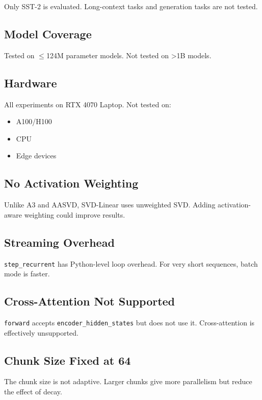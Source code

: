 Only SST-2 is evaluated. Long-context tasks and generation tasks are not 
tested.

\subsection{Model Coverage}

Tested on $\le$124M parameter models. Not tested on \textgreater{}1B models.

\subsection{Hardware}

All experiments on RTX 4070 Laptop. Not tested on:
\begin{itemize}
\item A100/H100
\item CPU
\item Edge devices

\end{itemize}
\subsection{No Activation Weighting}

Unlike A3 and AASVD, SVD-Linear uses unweighted SVD. Adding activation-aware 
weighting could improve results.

\subsection{Streaming Overhead}

\texttt{step\_recurrent} has Python-level loop overhead. For very short sequences, 
batch mode is faster.

\subsection{Cross-Attention Not Supported}

\texttt{forward} accepts \texttt{encoder\_hidden\_states} but does not use it. Cross-attention 
is effectively unsupported.

\subsection{Chunk Size Fixed at 64}

The chunk size is not adaptive. Larger chunks give more parallelism but 
reduce the effect of decay.

